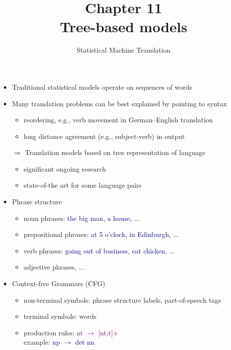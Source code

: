 \documentclass[landscape]{slides}
\newcommand{\example}[1]{\textcolor{darkblue}{\rm #1}}
\newcommand{\maths}[1]{\textcolor{purple}{#1}}
\begin{document}
\title[Chapter 11: Tree-Based Models]{Chapter 11\\[1cm] Tree-based models}
\author[Philipp Koehn]{}
\date{Statistical Machine Translation}

\maketitle


\begin{itemize}\itemsep 10mm \vspace{10mm}
\item Traditional statistical models operate on sequences of words
\item Many translation problems can be best explained by pointing to syntax
\begin{itemize}
\item reordering, e.g., verb movement in German--English translation
\item long distance agreement (e.g., subject-verb) in output
\end{itemize}
\item[$\Rightarrow$] Translation models based on tree representation of language
\begin{itemize}
\item significant ongoing research
\item state-of-the art for some language pairs
\end{itemize}
\end{itemize}


\begin{itemize} \vspace{10mm}
\item Phrase structure
\begin{itemize}
\item noun phrases: \example{the big man}, \example{a house}, ...
\item prepositional phrases: \example{at 5 o'clock}, \example{in Edinburgh}, ...
\item verb phrases: \example{going out of business}, \example{eat chicken}, ...
\item adjective phrases, ...
\end{itemize}
\item Context-free Grammars (CFG)
\begin{itemize}
\item non-terminal symbols: phrase structure labels, part-of-speech tags
\item terminal symbols: words
\item production rules: \maths{\sc nt $\rightarrow$ [nt,t]+}\\
example: \example{\sc np $\rightarrow$ det nn}
\end{itemize}
\end{itemize}
\end{document}
